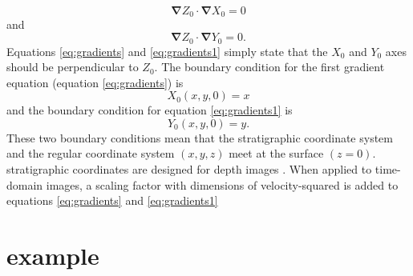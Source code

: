 \begin{equation}
\label{eq:gradients}
\mathbf{\nabla} Z_0 \cdot \mathbf{\nabla }X_0 = 0
\end{equation}
and
\begin{equation}
\label{eq:gradients1}
\mathbf{\nabla} Z_0 \cdot \mathbf{\nabla} Y_0 = 0.
\end{equation}
Equations \ref{eq:gradients}  and \ref{eq:gradients1} simply state that the $X_0$ and $Y_0$ axes should be perpendicular to $Z_0$.  The boundary condition for the first gradient equation (equation \ref{eq:gradients}) is
\begin{equation}
\label{boundary condition}
X_0\left(x,y,0\right)=x                                                                         
\end{equation}
and the boundary condition for equation \ref{eq:gradients1} is
\begin{equation}
\label{boundary condition1}
Y_0\left(x,y,0\right)=y.                                                                         
\end{equation} 
These two boundary conditions mean that the stratigraphic coordinate system and the regular coordinate system $\left(x,y,z\right)$ meet at the surface $\left(z = 0\right)$.   stratigraphic coordinates are designed for depth images . When applied to time-domain images, a scaling factor with dimensions of velocity-squared is added to equations \ref{eq:gradients} and \ref{eq:gradients1}\new{,} 

\section{example}

